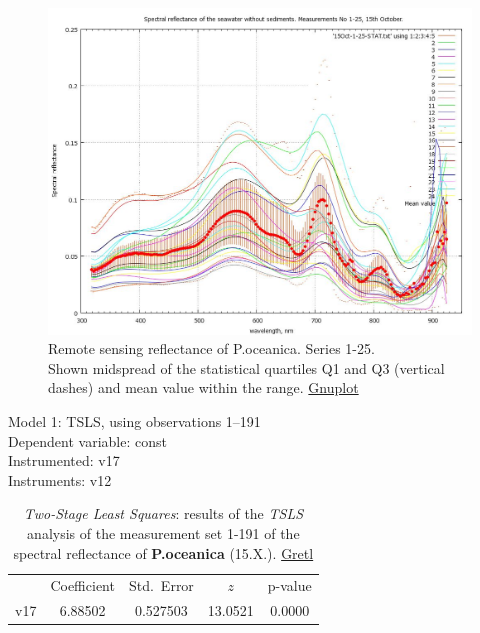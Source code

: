 \documentclass[10pt, a4paper]{article}
\begin{document}
\begin{appendices}
\begin{figure}[H]
	\begin{center}
		\includegraphics[scale=0.25]{GNU-12.jpg}
		\caption{Remote sensing reflectance of P.oceanica. Series 1-25. \\Shown midspread of the statistical quartiles Q1 and Q3 (vertical dashes) and mean value within the range.  \href{http://www.gnuplot.info/}{Gnuplot}­}
		\label{fig:57}
	\end{center}
\end{figure}

\begin{table}[htbp]
	\caption{\textit{Two-Stage Least Squares}: results of the \textit{TSLS} analysis of the measurement set 1-191 of the spectral reflectance of \textbf{P.oceanica} (15.X.). \href{http://gretl.sourceforge.net/}{Gretl}}
	\begin{center}
		Model 1: TSLS, using observations 1--191\\
		Dependent variable: const\\
		Instrumented: v17 \\
		Instruments: v12 \\

	\vspace{1em}

	\begin{tabular}{|c c c c c|}
		  &  {Coefficient} &  {Std.\ Error} &  {$z$} &    {p-value} \\[1ex]
		v17 &  6.88502 & 0.527503 & 13.0521 & 0.0000 \\
	\end{tabular}


\end{center}
\end{table}
\end{appendices}
\end{document}
